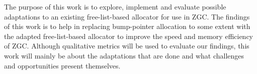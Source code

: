 


The purpose of this work is to explore, implement and evaluate possible adaptations to an existing free-list-based allocator for use in ZGC. The findings of this work is to help in replacing bump-pointer allocation to some extent with the adapted free-list-based allocator to improve the speed and memory efficiency of ZGC. Although qualitative metrics will be used to evaluate our findings, this work will mainly be about the adaptations that are done and what challenges and opportunities present themselves.

